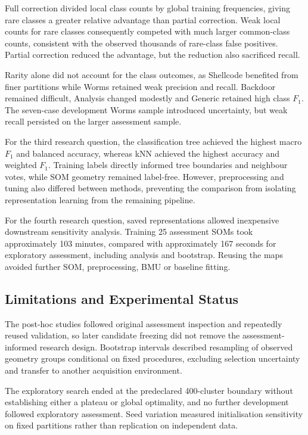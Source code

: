 Full correction divided local class counts by global training frequencies, giving rare classes a greater relative advantage than partial correction. Weak local counts for rare classes consequently competed with much larger common-class counts, consistent with the observed thousands of rare-class false positives. Partial correction reduced the advantage, but the reduction also sacrificed recall.

Rarity alone did not account for the class outcomes, as Shellcode benefited from finer partitions while Worms retained weak precision and recall. Backdoor remained difficult, Analysis changed modestly and Generic retained high class $F_1$. The seven-case development Worms sample introduced uncertainty, but weak recall persisted on the larger assessment sample.

For the third research question, the classification tree achieved the highest macro $F_1$ and balanced accuracy, whereas kNN achieved the highest accuracy and weighted $F_1$. Training labels directly informed tree boundaries and neighbour votes, while SOM geometry remained label-free. However, preprocessing and tuning also differed between methods, preventing the comparison from isolating representation learning from the remaining pipeline.

For the fourth research question, saved representations allowed inexpensive downstream sensitivity analysis. Training 25 assessment SOMs took approximately 103 minutes, compared with approximately 167 seconds for exploratory assessment, including analysis and bootstrap. Reusing the maps avoided further SOM, preprocessing, BMU or baseline fitting.

\subsection{Limitations and Experimental Status}

The post-hoc studies followed original assessment inspection and repeatedly reused validation, so later candidate freezing did not remove the assessment-informed research design. Bootstrap intervals described resampling of observed geometry groups conditional on fixed procedures, excluding selection uncertainty and transfer to another acquisition environment.

The exploratory search ended at the predeclared 400-cluster boundary without establishing either a plateau or global optimality, and no further development followed exploratory assessment. Seed variation measured initialisation sensitivity on fixed partitions rather than replication on independent data.

